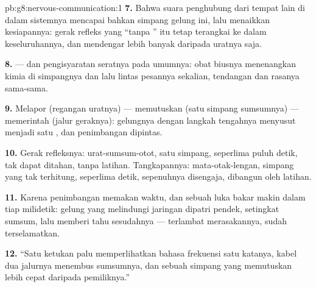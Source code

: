 \begin{solution}{pb:g8:nervous-communication:1}
\textbf{7.} Bahwa suara  penghubung dari tempat lain
di dalam sistemnya mencapai bahkan simpang gelung ini, lalu
menaikkan kesiapannya: gerak refleks yang ``tanpa '' itu
tetap terangkai ke dalam keseluruhannya, dan 
mendengar lebih banyak daripada uratnya saja.

\textbf{8.}  --- dan pengisyaratan seratnya pada
umumnya: obat biusnya menenangkan kimia di simpangnya dan
lalu lintas pesannya sekalian, tendangan dan rasanya sama-sama.

\textbf{9.} Melapor (regangan uratnya) --- memutuskan (satu
simpang sumsumnya) --- memerintah (jalur geraknya):
gelungnya dengan langkah tengahnya menyusut menjadi satu
, dan penimbangan  dipintas.

\textbf{10.} Gerak refleksnya: urat-sumsum-otot, satu
simpang, seperlima puluh detik, tak dapat ditahan, tanpa
latihan. Tangkapannya: mata-otak-lengan, simpang yang tak
terhitung, seperlima detik, sepenuhnya disengaja, dibangun
oleh latihan.

\textbf{11.} Karena penimbangan  memakan waktu, dan
sebuah luka bakar makin dalam tiap milidetik: gelung yang
melindungi jaringan dipatri pendek, setingkat sumsum, lalu
memberi tahu  sesudahnya --- terlambat merasakannya,
sudah terselamatkan.

\textbf{12.} ``Satu ketukan palu memperlihatkan bahasa
frekuensi satu katanya, kabel dua jalurnya menembus
sumsumnya, dan sebuah simpang yang memutuskan lebih cepat
daripada pemiliknya.''
\end{solution}
